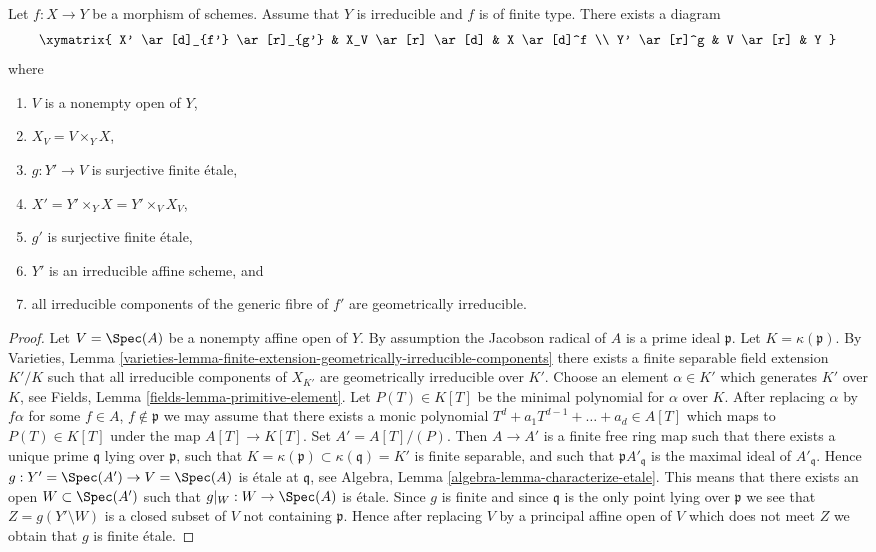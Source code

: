 \begin{lemma}
\label{lemma-make-components-generic-fibre-geometrically-irreducible}
Let $f : X \to Y$ be a morphism of schemes.
Assume that $Y$ is irreducible and $f$ is of finite type.
There exists a diagram
$$
\xymatrix{
X' \ar[d]_{f'} \ar[r]_{g'} & X_V \ar[r] \ar[d] & X \ar[d]^f \\
Y' \ar[r]^g & V \ar[r] & Y
}
$$
where
\begin{enumerate}
\item $V$ is a nonempty open of $Y$,
\item $X_V = V \times_Y X$,
\item $g : Y' \to V$ is surjective finite \'etale,
\item $X' = Y' \times_Y X = Y' \times_V X_V$,
\item $g'$ is surjective finite \'etale,
\item $Y'$ is an irreducible affine scheme, and
\item all irreducible components of the generic fibre of $f'$
are geometrically irreducible.
\end{enumerate}
\end{lemma}

\begin{proof}
Let $V = \Spec(A)$ be a nonempty affine open of $Y$.
By assumption the Jacobson radical of $A$ is a prime ideal $\mathfrak p$.
Let $K = \kappa(\mathfrak p)$. By
Varieties, Lemma
\ref{varieties-lemma-finite-extension-geometrically-irreducible-components}
there exists a finite separable field extension
$K'/K$ such that all irreducible components of $X_{K'}$ are
geometrically irreducible over $K'$.
Choose an element $\alpha \in K'$ which generates $K'$ over
$K$, see
Fields, Lemma \ref{fields-lemma-primitive-element}.
Let $P(T) \in K[T]$ be the minimal polynomial for $\alpha$ over $K$.
After replacing $\alpha$ by $f \alpha$ for some
$f \in A$, $f \not \in \mathfrak p$
we may assume that there exists a monic polynomial
$T^d + a_1T^{d - 1} + \ldots + a_d \in A[T]$ which maps to
$P(T) \in K[T]$ under the map $A[T] \to K[T]$.
Set $A' = A[T]/(P)$. Then $A \to A'$ is a finite free ring map
such that there exists a unique prime $\mathfrak q$ lying over
$\mathfrak p$, such that
$K = \kappa(\mathfrak p) \subset \kappa(\mathfrak q) = K'$
is finite separable, and such that $\mathfrak pA'_{\mathfrak q}$
is the maximal ideal of $A'_{\mathfrak q}$.
Hence $g : Y' = \Spec(A') \to V = \Spec(A)$
is \'etale at $\mathfrak q$, see
Algebra, Lemma \ref{algebra-lemma-characterize-etale}.
This means that there exists an open $W \subset \Spec(A')$ such
that $g|_W : W \to \Spec(A)$ is \'etale.
Since $g$ is finite and since $\mathfrak q$ is the only point lying over
$\mathfrak p$ we see that $Z = g(Y' \setminus W)$ is a closed subset of $V$
not containing $\mathfrak p$. Hence after replacing $V$ by a principal
affine open of $V$ which does not meet $Z$ we obtain that $g$ is finite
\'etale.
\end{proof}







